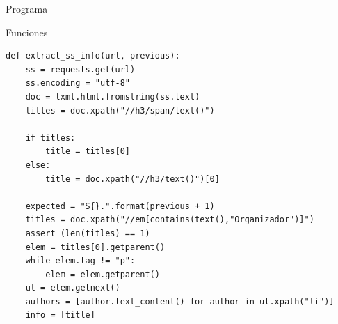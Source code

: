 \documentclass[bigger,unknownkeysallowed]{beamer}
\begin{document}
\begin{frame}[fragile,label={sec:orgcc9b502}]{Programa}
 \begin{block}{Funciones}
\lstset{language=Python,label= ,caption= ,captionpos=b,numbers=none}
\begin{lstlisting}
def extract_ss_info(url, previous):
    ss = requests.get(url)
    ss.encoding = "utf-8"
    doc = lxml.html.fromstring(ss.text)
    titles = doc.xpath("//h3/span/text()")

    if titles:
        title = titles[0]
    else:
        title = doc.xpath("//h3/text()")[0]

    expected = "S{}.".format(previous + 1)
    titles = doc.xpath("//em[contains(text(),"Organizador")]")
    assert (len(titles) == 1)
    elem = titles[0].getparent()
    while elem.tag != "p":
        elem = elem.getparent()
    ul = elem.getnext()
    authors = [author.text_content() for author in ul.xpath("li")]
    info = [title]
\end{lstlisting}
\end{block}
\end{frame}
\end{document}

